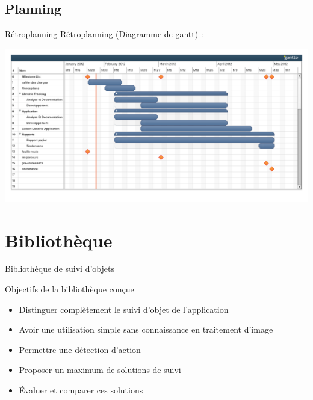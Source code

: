 \documentclass{beamer}
\begin{document}
	\subsection{Planning}
		\begin{frame}{Rétroplanning}	
			Rétroplanning (Diagramme de gantt) :
			\begin{center}
			\includegraphics[scale=0.25]{../feuille-route/retroplanning.pdf}
			\end{center}
		\end{frame}
	
	\section{Bibliothèque}
		\begin{frame}{Bibliothèque de suivi d'objets}
			\begin{block}{Objectifs de la bibliothèque conçue}
				\begin{itemize}
				\item{Distinguer complètement le suivi d'objet de l'application}
				\item{Avoir une utilisation simple sans connaissance en traitement d'image}
				\item{Permettre une détection d'action}
				\item{Proposer un maximum de solutions de suivi}
				\item{Évaluer et comparer ces solutions}
				\end{itemize}
			\end{block}
		\end{frame}
\end{document}
